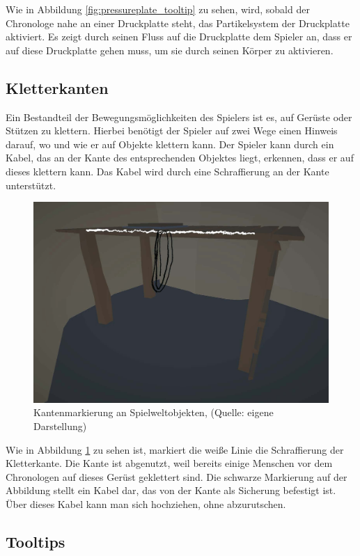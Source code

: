 Wie in Abbildung \ref{fig:pressureplate_tooltip} zu sehen, wird, sobald der Chronologe nahe an einer Druckplatte steht, das Partikelsystem der Druckplatte aktiviert. Es zeigt durch seinen Fluss auf die Druckplatte dem Spieler an, dass er auf diese Druckplatte gehen muss, um sie durch seinen Körper zu aktivieren.

\subsection{Kletterkanten}\label{sec:leadge}
Ein Bestandteil der Bewegungsmöglichkeiten des Spielers ist es, auf Gerüste oder Stützen zu klettern. Hierbei benötigt der Spieler auf zwei Wege einen Hinweis darauf, wo und wie er auf Objekte klettern kann.
Der Spieler kann durch ein Kabel, das an der Kante des entsprechenden Objektes liegt, erkennen, dass er auf dieses klettern kann. Das Kabel wird durch eine Schraffierung an der Kante unterstützt.

\begin{figure}[ht]
\centering
\includegraphics[width=0.8\linewidth]{content/pictures/leadge_wireframe.jpg}
\caption{Kantenmarkierung an Spielweltobjekten, (Quelle: eigene Darstellung)}
\label{fig:leadge}
\end{figure}

Wie in Abbildung \ref{fig:leadge} zu sehen ist, markiert die weiße Linie die Schraffierung der Kletterkante. Die Kante ist abgenutzt, weil bereits einige Menschen vor dem Chronologen auf dieses Gerüst geklettert sind. 
Die schwarze Markierung auf der Abbildung stellt ein Kabel dar, das von der Kante als Sicherung befestigt ist. Über dieses Kabel kann man sich hochziehen, ohne abzurutschen.

\subsection{Tooltips}\label{sec:tooltip}

